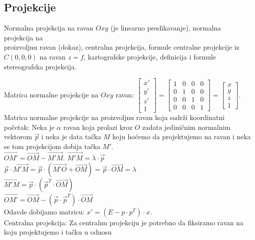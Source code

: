 \documentclass[12pt]{article}
\newcommand{\vek}[1]{\overrightarrow{#1}}
\begin{document}
    \subsection{Projekcije}
    Normalna projekcija na ravan $Oxy$ (je linearno preslikavanje),
    normalna projekcija na \\proizvoljnu ravan (dokaz),
    centralna projekcija, formule centralne projekcije iz
$C(0,0,0)$ na ravan $z=f$, kartografske projekcije,
    definicija i formule stereografska projekcija.\par

    \vspace*{1cm}

    Matrica normalne projekcije na $Oxy$ ravan:
$\begin{bmatrix}
    x' \\
    y' \\
    z' \\
    1
\end{bmatrix}=\begin{bmatrix}
    1 & 0 & 0 & 0 \\
    0 & 1 & 0 & 0 \\
    0 & 0 & 1 & 0 \\
    0 & 0 & 0 & 1
\end{bmatrix}=\begin{bmatrix}
    x \\
    y \\
    z \\
    1
\end{bmatrix}$.\\
    Matrica normalne projekcije na proizvoljnu ravan koja sadrži koordinatni početak:
    Neka je $\alpha$ ravan koja prolazi kroz $O$ zadata jediničnim
    normalnim vektorom $\vek{p}$ i neka je data tačka $M$
    koju hoćemo da projektujemo na ravan i neka se
    tom projekcijom dobija tačka $M'$.\\
$\vek{OM'}=\vek{OM}-\vek{M'M}$.
$\vek{M'M}=\lambda\cdot\vek{p}$\\
$\vek{p}\cdot\vek{M'M}=\vek{p}\cdot(\vek{M'O}+\vek{OM})=\vek{p}\cdot\vek{OM}=\lambda$\\
$\vek{M'M}=\vek{p}\cdot (\vek{p}^T\cdot\vek{OM})$\\
$\vek{OM'}=\vek{OM}-(\vek{p}\cdot \vek{p}^T)\cdot\vek{OM}$\\
    Odavde dobijamo matricu: $x'=(E-p\cdot p^T)\cdot x$.\\
    Centralna projekcija: Za centralnu projekciju je potrebno
    da fiksiramo ravan na koju projektujemo i tačku u odnosu
\end{document}
